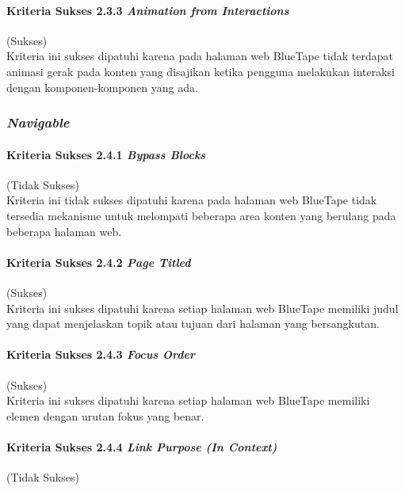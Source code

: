 \paragraph{Kriteria Sukses 2.3.3 \textit{Animation from Interactions}}
\label{par:kepatuhan_bluetape_kriteria_sukses_2.3.3}
(Sukses)\\

Kriteria ini sukses dipatuhi karena pada halaman web BlueTape tidak terdapat animasi gerak pada konten yang disajikan ketika pengguna melakukan interaksi dengan komponen-komponen yang ada.

\subsubsection{\textit{Navigable}}
\label{subsubsec:kepatuhan_bluetape_navigable}

\paragraph{Kriteria Sukses 2.4.1 \textit{Bypass Blocks}}
\label{par:kepatuhan_bluetape_kriteria_sukses_2.4.1}
(Tidak Sukses)\\

Kriteria ini tidak sukses dipatuhi karena pada halaman web BlueTape tidak tersedia mekanisme untuk melompati beberapa area konten yang berulang pada beberapa halaman web.

\paragraph{Kriteria Sukses 2.4.2 \textit{Page Titled}}
\label{par:kepatuhan_bluetape_kriteria_sukses_2.4.2}
(Sukses)\\

Kriteria ini sukses dipatuhi karena setiap halaman web BlueTape memiliki judul yang dapat menjelaskan topik atau tujuan dari halaman yang bersangkutan.

\paragraph{Kriteria Sukses 2.4.3 \textit{Focus Order}}
\label{par:kepatuhan_bluetape_kriteria_sukses_2.4.3}
(Sukses)\\

Kriteria ini sukses dipatuhi karena setiap halaman web BlueTape memiliki elemen dengan urutan fokus yang benar. 

\paragraph{Kriteria Sukses 2.4.4 \textit{Link Purpose (In Context)}}
\label{par:kepatuhan_bluetape_kriteria_sukses_2.4.4}
(Tidak Sukses)\\

